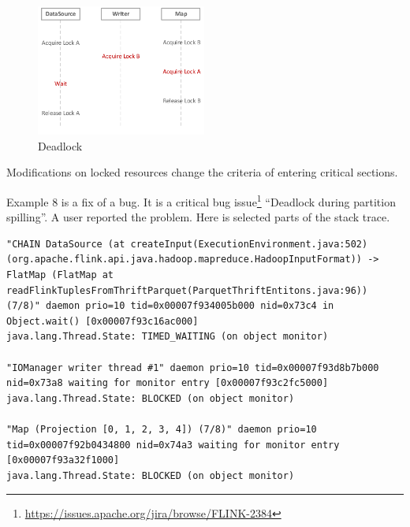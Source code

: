 
\begin{figure}
	\centering
	\includegraphics[height=1.7in]{deadlock}
	\caption{Deadlock}
\end{figure}


Modifications on locked resources change the criteria of entering critical sections.  

Example 8 is a fix of a bug. It is a critical bug issue\footnote{\url{https://issues.apache.org/jira/browse/FLINK-2384}} ``Deadlock during partition spilling''. A user reported the problem. Here is selected parts of the stack trace.

\begin{lstlisting}
"CHAIN DataSource (at createInput(ExecutionEnvironment.java:502) (org.apache.flink.api.java.hadoop.mapreduce.HadoopInputFormat)) -> FlatMap (FlatMap at readFlinkTuplesFromThriftParquet(ParquetThriftEntitons.java:96)) (7/8)" daemon prio=10 tid=0x00007f934005b000 nid=0x73c4 in Object.wait() [0x00007f93c16ac000]
java.lang.Thread.State: TIMED_WAITING (on object monitor)

"IOManager writer thread #1" daemon prio=10 tid=0x00007f93d8b7b000 nid=0x73a8 waiting for monitor entry [0x00007f93c2fc5000]
java.lang.Thread.State: BLOCKED (on object monitor)

"Map (Projection [0, 1, 2, 3, 4]) (7/8)" daemon prio=10 tid=0x00007f92b0434800 nid=0x74a3 waiting for monitor entry [0x00007f93a32f1000]
java.lang.Thread.State: BLOCKED (on object monitor)
\end{lstlisting}


